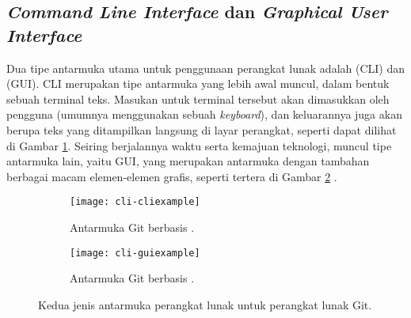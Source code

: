 \subsection{\textit{Command Line Interface} dan \textit{Graphical User Interface}}
\label{sec:commandline-comparison}

Dua tipe antarmuka utama untuk penggunaan perangkat lunak adalah \cli\xspace (CLI) dan \gui\xspace(GUI). CLI merupakan tipe antarmuka yang lebih awal muncul, dalam bentuk sebuah terminal teks. Masukan untuk terminal tersebut akan dimasukkan oleh pengguna (umumnya menggunakan sebuah \textit{keyboard}), dan keluarannya juga akan berupa teks yang ditampilkan langsung di layar perangkat, seperti dapat dilihat di Gambar \ref{fig:commandline-comparison-cli}. Seiring berjalannya waktu serta kemajuan teknologi, muncul tipe antarmuka lain, yaitu GUI, yang merupakan antarmuka dengan tambahan berbagai macam elemen-elemen grafis, seperti tertera di Gambar \ref{fig:commandline-comparison-gui} \cite{kavakli:2007:clivsguivr}.

\begin{figure}[ht]
    \begin{subfigure}[b]{0.475\linewidth}
		\centering
		\texttt{[image: cli-cliexample]}
		\caption{Antarmuka Git berbasis \cli.}
		\label{fig:commandline-comparison-cli}
	\end{subfigure}
	\hfill
    \begin{subfigure}[b]{0.475\linewidth}
		\centering
		\texttt{[image: cli-guiexample]}
		\caption{Antarmuka Git berbasis \gui.}
		\label{fig:commandline-comparison-gui}
	\end{subfigure}
    \caption[Dua jenis antarmuka perangkat lunak]{Kedua jenis antarmuka perangkat lunak untuk perangkat lunak Git.}
	\label{fig:commandline-comparison}
\end{figure}

